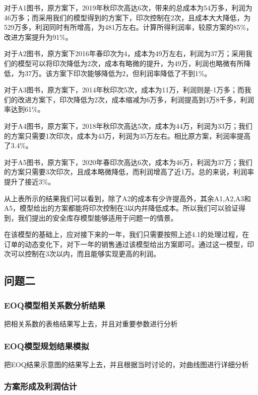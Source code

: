 \documentclass[bwprint]{gmcmthesis}
\begin{document}
对于A1图书，原方案下，2019年秋印次高达6次，带来的总成本为54万多，利润为46万多；而采用我们的模型得到的方案下，印次控制在2次，且成本大大降低，为529万多，利润同时有所增高，为481万左右。计算所得利润率，较原方案的85\%，改进方案提升为91\%。

对于A2图书，原方案下2016年春印次为4，成本为49万左右，利润为37万；采用我们的模型可以将印次降低为2次，成本有略微的提升，为49万，利润也略微有所降低，为37万。该方案下印次能够降低为2，但利润率降低了不到1\%。

对于A3图书，原方案下，2014年秋印次5次，成本为11万，利润则是-1万多；而我们的改进方案下，印次降低为2次，成本缩减为6万多，利润提高到3万8千多，利润率达到61\%。

对于A4图书，原方案下，2018年秋印次高达5次，成本为44万，利润为33万；我们的方案只需要1次印次，成本为43万，利润为35万左右。相比原方案，利润率提高了3.4\%。

对于A5图书，原方案下，2020年春印次高达6次，成本为46万，利润为37万；我们的方案只需要3次印次，且成本略微降低，而利润增高了近1万。总的来说，利润率提升了接近3\%。

从上表所示的结果我们可以看到，除了A2的成本有少许提高外，其余A1,A2,A3和A5，模型给出的方案都能将印次控制在3以内并降低成本。所以我们可以验证得到，我们提出的安全库存模型能够适用于问题一的情景。

在该模型的基础上，应对接下来的一年，我们只需要按照上述4.1的处理过程，在订单的动态变化下，对下一年的销售通过该模型给出方案即可。通过这一模型，印次可以控制在3次以内，而且能够实现更高的利润。

\subsection{问题二}

\subsubsection{EOQ模型相关系数分析结果}

把相关系数的表格结果写上去，并且对重要参数进行分析

\subsubsection{EOQ模型规划结果模拟}

把EOQ结果示意图的结果写上去，并且根据当时讨论的，对曲线图进行详细分析

\subsubsection{方案形成及利润估计}
\end{document}
